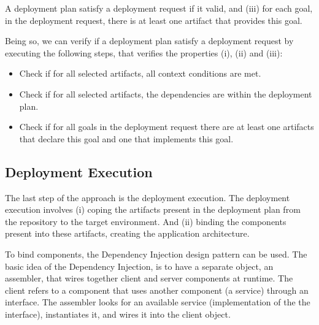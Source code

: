 A deployment plan satisfy a deployment request if it valid, and (iii) for each goal, in the deployment request, there is at least one artifact that provides this goal.

Being so, we can verify if a deployment plan satisfy a deployment request by executing the following steps, that verifies the properties (i), (ii) and (iii):

\begin{itemize}
  \item Check if for all selected artifacts, all context conditions are met.
  \item Check if for all selected artifacts, the dependencies are within the deployment plan.
  \item Check if for all goals in the deployment request there are at least one artifacts that declare this goal and one that implements this goal.
\end{itemize}

\subsection{Deployment Execution}
\label{sec:planning}

The last step of the approach is the deployment execution. The deployment execution involves (i) coping the artifacts present in the deployment plan from the repository to the target environment. And (ii) binding the components present into these artifacts, creating the application architecture.

To bind components, the Dependency Injection design pattern can be used. The basic idea of the Dependency Injection, is to have a separate object, an assembler, that wires together client and server components at runtime\cite{fowler_inversion_2004}. The client refers to a component that uses another component (a service) through an interface. The assembler looks for an available service (implementation of the the interface), instantiates it, and wires it into the client object.
